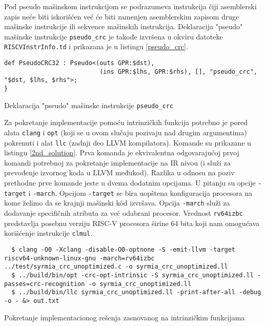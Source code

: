 \documentclass[12pt,oneside]{memoir}
\begin{document}
Pod pseudo mašinskom instrukcijom se podrazumeva instrukcija čiji asemblerski zapis neće biti iskorišćen već će biti zamenjen asemblerskim zapisom druge mašinske instrukcije ili sekvence mašinskih instrukcija. Deklaracija "pseudo" mašinske instrukcije \texttt{pseudo\_crc} je takođe izvršena u okviru datoteke \texttt{RISCVInstrInfo.td} i prikazana je u listingu \ref{pseudo_crc}. 

\begin{listing}[!ht]
\begin{verbatim}
def PseudoCRC32 : Pseudo<(outs GPR:$dst),
                          (ins GPR:$lhs, GPR:$rhs), [], "pseudo_crc", "$dst, $lhs, $rhs">;
}
\end{verbatim}
\caption{Deklaracija "pseudo" mašinske instrukcije \texttt{pseudo\_crc}}
\label{pseudo_crc}
\centering
\end{listing}

Za pokretanje implementacije pomoću intrinzičkih funkcija potrebno je pored alata \texttt{clang} i \texttt{opt} (koji se u ovom slučaju pozivaju nad drugim argumentima) pokrenuti i alat \texttt{llc} (zadnji deo LLVM kompilatora). Komande su prikazane u listingu \ref{2nd_solution}. Prva komanda je ekvivalentna odgovarajućoj prvoj komandi potrebnoj za pokretanje implementacije na IR nivou (i služi za prevođenje izvornog koda u LLVM međukod). Razlika u odnosu na poziv prethodne prve komande jeste u dvema dodatnim opcijama. U pitanju su opcije \texttt{-target} i \texttt{-march}. Opcijom \texttt{-target} se bira uopštena konfiguracija procesora na kome želimo da se krajnji mašinski k\^od izvršava. Opcija \texttt{-march} služi za dodavanje specifičnih atributa za već odabrani procesor. Vrednost \texttt{rv64izbc} predstavlja posebnu verziju RISC-V procesora širine 64 bita koji nam omogućava korišćenje instrukcije \texttt{clmul}.

\begin{listing}[!ht]
\begin{verbatim}
  $ clang -O0 -Xclang -disable-O0-optnone -S -emit-llvm -target riscv64-unknown-linux-gnu -march=rv64izbc ../test/syrmia_crc_unoptimized.c -o syrmia_crc_unoptimized.ll
  $ ../build/bin/opt -crc-opt-intrinsic -S syrmia_crc_unoptimized.ll -passes=crc-recognition -o syrmia_crc_unoptimized.ll
  $ ../build/bin/llc syrmia_crc_unoptimized.ll -print-after-all -debug -o - &> out.txt
\end{verbatim}
\caption{Pokretanje implementacionog rešenja zasnovanog na intrinzičkim funkcijama}
\label{2nd_solution}
\centering
\end{listing}
\end{document}
